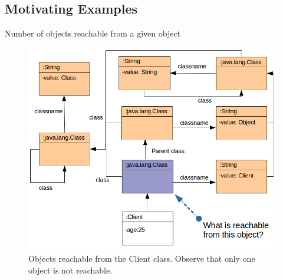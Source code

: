 \documentclass[10pt,xcolor={dvipsnames}]{beamer}
\begin{document}
	\subsection[Motivating Examples]{Motivating Examples}
	\begin{frame}{Number of objects reachable from a given object}
		\begin{figure}[!ht]
			\centering
			\includegraphics[scale=0.3]{../chapter6/fig/example1.png}
			\caption{\scriptsize Objects reachable from the Client class. Observe that only one object is not reachable.}
		\end{figure}
	\end{frame}
	
\end{document}

